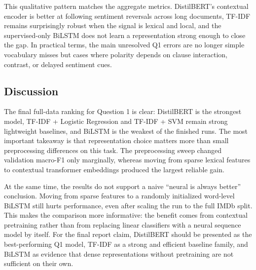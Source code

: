 This qualitative pattern matches the aggregate metrics. DistilBERT's contextual encoder is better at following sentiment reversals across long documents, TF-IDF remains surprisingly robust when the signal is lexical and local, and the supervised-only BiLSTM does not learn a representation strong enough to close the gap. In practical terms, the main unresolved Q1 errors are no longer simple vocabulary misses but cases where polarity depends on clause interaction, contrast, or delayed sentiment cues.

\subsection{Discussion}

The final full-data ranking for Question 1 is clear: DistilBERT is the strongest model, TF-IDF + Logistic Regression and TF-IDF + SVM remain strong lightweight baselines, and BiLSTM is the weakest of the finished runs. The most important takeaway is that representation choice matters more than small preprocessing differences on this task. The preprocessing sweep changed validation macro-F1 only marginally, whereas moving from sparse lexical features to contextual transformer embeddings produced the largest reliable gain.

At the same time, the results do not support a naive ``neural is always better'' conclusion. Moving from sparse features to a randomly initialized word-level BiLSTM still hurts performance, even after scaling the run to the full IMDb split. This makes the comparison more informative: the benefit comes from contextual pretraining rather than from replacing linear classifiers with a neural sequence model by itself. For the final report claim, DistilBERT should be presented as the best-performing Q1 model, TF-IDF as a strong and efficient baseline family, and BiLSTM as evidence that dense representations without pretraining are not sufficient on their own.